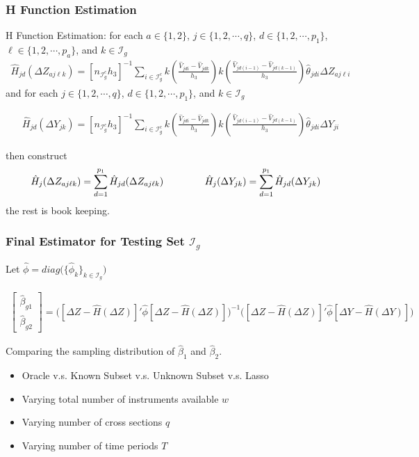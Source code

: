 \documentclass[9pt]{beamer}
\begin{document}
\begin{frame} 
\frametitle{H Function Estimation} 

H Function Estimation: for each $a\in \{1,2\}$, $j\in \{1,2,\cdots,q\}$, $d \in \{1,2, \cdots,p_1\}$, $\ell \in \{1,2,\cdots,p_a\}$, and $k \in \mathcal{I}_g$
\begin{align*} 
 \hat{H}_{jd}(\Delta Z_{aj\ell k}) = [n_{\mathcal{I}_g^c}h_3]^{-1} \sum_{  i \in \mathcal{I}_g^c }k\left( \frac{\hat{V}_{jdi} -\hat{V}_{jdk} }{h_3} \right)k\left( \frac{\hat{V}_{jd(i-1)} -\hat{V}_{jd(k-1)}}{h_3} \right)  \hat{\theta}_{jdi} \Delta Z_{aj\ell i}
 \end{align*}
and for each $j\in \{1,2,\cdots,q\}$, $d \in \{1,2, \cdots,p_1\}$, and $k \in \mathcal{I}_g$

\begin{align*} 
 \hat{H}_{jd}(\Delta Y_{j k}) = [n_{\mathcal{I}_g^c}h_3]^{-1} \sum_{  i \in \mathcal{I}_g^c }k\left( \frac{\hat{V}_{jdi} -\hat{V}_{jdk} }{h_3} \right)k\left( \frac{\hat{V}_{jd(i-1)} -\hat{V}_{jd(k-1)}}{h_3} \right)  \hat{\theta}_{jdi} \Delta Y_{j i}
 \end{align*}
 
 then construct 
    \begin{align*} 
     \hat{H}_{j}(\Delta Z_{aj\ell k}) &= \sum_{d=1}^{p_1}  \hat{H}_{jd}(\Delta Z_{aj\ell k})   \hspace{1.5cm}
%
\hat{H}_j(\Delta Y_{jk}) = \sum_{d=1}^{p_1} \hat{H}_{jd}(\Delta Y_{jk}) 
    \end{align*}
the rest is book keeping. 
\end{frame}
\begin{frame} 
\frametitle{Final Estimator for Testing Set $\mathcal{I}_g$ } 

Let $\hat{\phi} = diag\big( \{\hat{\phi}_k\}_{k \in \mathcal{I}_g} \big)$

    \begin{align*} 
\begin{bmatrix} \hat{\beta}_{g1} \\[10pt] \hat{\beta}_{g2} \end{bmatrix} = \Big( [\Delta Z - \hat{H}(\Delta Z)]' \hat{\phi} [\Delta Z - \hat{H}(\Delta Z)] \Big)^{-1} \Big( [\Delta Z - \hat{H}(\Delta Z)]' \hat{\phi} [\Delta Y - \hat{H}(\Delta Y)] \Big)
    \end{align*}


Comparing the sampling distribution of $\hat{\beta}_1$ and $\hat{\beta}_2$.
\begin{itemize}  \addtolength{\itemsep}{\baselineskip}
    \item Oracle v.s. Known Subset v.s. Unknown Subset v.s. Lasso
    \item Varying total number of instruments available $w$
    \item Varying number of cross sections $q$
    \item Varying number of time periods $T$ 
\end{itemize}



\end{frame}
\end{document}
